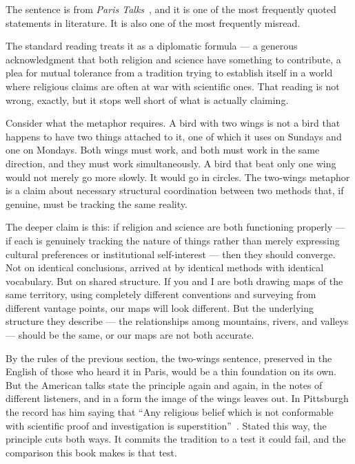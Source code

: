 The sentence is from \textit{Paris Talks}~\citeyearpar[p.~143]{ParisTalks},
and it is one of the most frequently quoted statements in \bahai literature.
It is also one of the most frequently misread.

The standard reading treats it as a diplomatic formula --- a generous
acknowledgment that both religion and science have something to contribute,
a plea for mutual tolerance from a tradition trying to establish itself
in a world where religious claims are often at war with scientific ones.
That reading is not wrong, exactly, but it stops well short of what
\AbdulBaha is actually claiming.

Consider what the metaphor requires.
A bird with two wings is not a bird that happens to have two things
attached to it, one of which it uses on Sundays and one on Mondays.
Both wings must work, and both must work in the same direction, and
they must work simultaneously.
A bird that beat only one wing would not merely go more slowly.
It would go in circles.
The two-wings metaphor is a claim about necessary structural coordination
between two methods that, if genuine, must be tracking the same reality.

The deeper claim is this: if religion and science are both functioning
properly --- if each is genuinely tracking the nature of things rather
than merely expressing cultural preferences or institutional self-interest ---
then they should converge.
Not on identical conclusions, arrived at by identical methods with identical
vocabulary.
But on shared structure.
If you and I are both drawing maps of the same territory, using completely
different conventions and surveying from different vantage points, our maps
will look different.
But the underlying structure they describe --- the relationships among
mountains, rivers, and valleys --- should be the same, or our maps are
not both accurate.

By the rules of the previous section, the two-wings sentence, preserved in the
English of those who heard it in Paris, would be a thin foundation on its own.
But the American talks state the principle again and again, in the notes of
different listeners, and in a form the image of the wings leaves out.
In Pittsburgh the record has him saying that ``Any religious belief which is
not conformable with scientific proof and investigation is
superstition''~\citep[Talk~44]{PUP}.
Stated this way, the principle cuts both ways.
It commits the tradition to a test it could fail, and the comparison this book
makes is that test.

